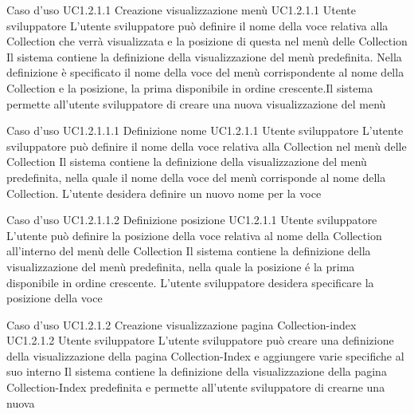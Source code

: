 \UCtitle
{Caso d'uso UC1.2.1.1}
{Creazione visualizzazione menù}
\UC
{UC1.2.1.1}
{Utente sviluppatore}
{L'utente sviluppatore può definire il nome della voce relativa alla Collection che verrà visualizzata e la posizione di questa nel menù delle Collection}
{Il sistema contiene la definizione della visualizzazione del menù predefinita. Nella definizione è specificato il nome della voce del menù corrispondente al nome della Collection e la posizione, la prima disponibile in ordine crescente.Il sistema permette all'utente sviluppatore di creare una nuova visualizzazione del menù}

\UCtitle
{Caso d'uso UC1.2.1.1.1}
{Definizione nome}
\UC
{UC1.2.1.1}
{Utente sviluppatore}
{L'utente sviluppatore può definire il nome della voce relativa alla Collection nel menù delle Collection}
{Il sistema contiene la definizione della visualizzazione del menù predefinita, nella quale il nome della voce del menù corrisponde al nome della Collection. L'utente desidera definire un nuovo nome per la voce}

\UCtitle
{Caso d'uso UC1.2.1.1.2}
{Definizione posizione}
\UC
{UC1.2.1.1}
{Utente sviluppatore}
{L'utente può definire la posizione della voce relativa al nome della Collection all'interno del menù delle Collection }
{Il sistema contiene la definizione della visualizzazione del menù predefinita, nella quale la posizione \'e la prima disponibile in ordine crescente. L'utente sviluppatore desidera specificare la posizione della voce}



\UCtitle
{Caso d'uso UC1.2.1.2}
{Creazione visualizzazione pagina Collection-index}
\UC
{UC1.2.1.2}
{Utente sviluppatore}
{L'utente sviluppatore  può creare una definizione della visualizzazione della pagina Collection-Index e aggiungere varie specifiche al suo interno}
{Il sistema contiene la definizione della visualizzazione della pagina Collection-Index predefinita e permette all'utente sviluppatore di crearne una nuova}


